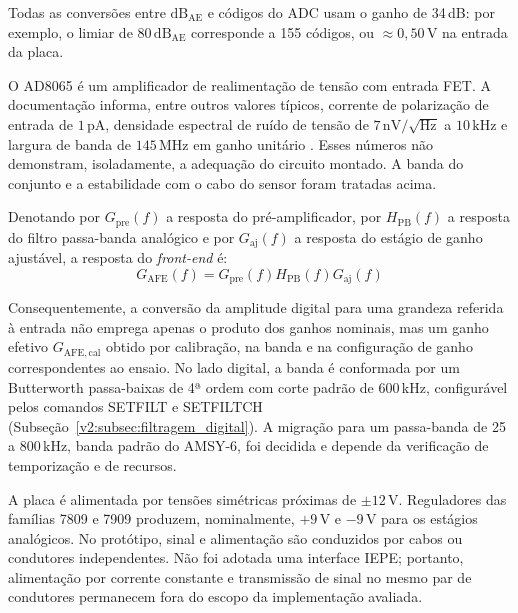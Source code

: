 Todas as conversões entre \(\mathrm{dB}_{\mathrm{AE}}\) e códigos do ADC usam o ganho de 34\,dB: por exemplo, o limiar de \(80\,\mathrm{dB}_{\mathrm{AE}}\) corresponde a 155 códigos, ou \(\approx 0{,}50\,\mathrm{V}\) na entrada da placa.

O AD8065 é um amplificador de realimentação de tensão com entrada FET. A documentação informa, entre outros valores típicos, corrente de polarização de entrada de \(1\,\mathrm{pA}\), densidade espectral de ruído de tensão de \(7\,\mathrm{nV}/\sqrt{\mathrm{Hz}}\) a \(10\,\mathrm{kHz}\) e largura de banda de \(145\,\mathrm{MHz}\) em ganho unitário \cite{analogdevicesad8065}. Esses números não demonstram, isoladamente, a adequação do circuito montado. A banda do conjunto e a estabilidade com o cabo do sensor foram tratadas acima.

Denotando por \(G_{\mathrm{pre}}(f)\) a resposta do pré-amplificador, por \(H_{\mathrm{PB}}(f)\) a resposta do filtro passa-banda analógico e por \(G_{\mathrm{aj}}(f)\) a resposta do estágio de ganho ajustável, a resposta do \textit{front-end} é:
\begin{equation}
	G_{\mathrm{AFE}}(f) = G_{\mathrm{pre}}(f) H_{\mathrm{PB}}(f) G_{\mathrm{aj}}(f)
	\label{v2:eq:ganho_front_end}
\end{equation}

Consequentemente, a conversão da amplitude digital para uma grandeza referida à entrada não emprega apenas o produto dos ganhos nominais, mas um ganho efetivo \(G_{\mathrm{AFE,cal}}\) obtido por calibração, na banda e na configuração de ganho correspondentes ao ensaio. No lado digital, a banda é conformada por um Butterworth passa-baixas de 4ª ordem com corte padrão de 600\,kHz, configurável pelos comandos SETFILT e SETFILTCH (Subseção~\ref{v2:subsec:filtragem_digital}). A migração para um passa-banda de 25 a 800\,kHz, banda padrão do AMSY-6, foi decidida e depende da verificação de temporização e de recursos.

A placa é alimentada por tensões simétricas próximas de \(\pm12\,\mathrm{V}\). Reguladores das famílias 7809 e 7909 produzem, nominalmente, \(+9\,\mathrm{V}\) e \(-9\,\mathrm{V}\) para os estágios analógicos. No protótipo, sinal e alimentação são conduzidos por cabos ou condutores independentes. Não foi adotada uma interface IEPE; portanto, alimentação por corrente constante e transmissão de sinal no mesmo par de condutores permanecem fora do escopo da implementação avaliada.

